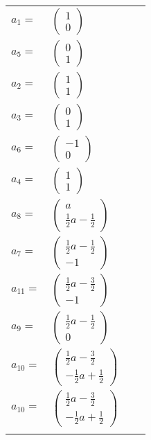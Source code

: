 \documentclass[1p]{elsarticle_modified}
\theoremstyle{definition}
\begin{document}
\begin{tabular}{m{7pt} m{180pt} m{7pt} m{180pt} }
\flushright $a_{1}=$&$\begin{pmatrix}1\\0\end{pmatrix}$ \\
\flushright $a_{5}=$&$\begin{pmatrix}0\\1\end{pmatrix}$ \\
\flushright $a_{2}=$&$\begin{pmatrix}1\\1\end{pmatrix}$ \\
\flushright $a_{3}=$&$\begin{pmatrix}0\\1\end{pmatrix}$ \\
\flushright $a_{6}=$&$\begin{pmatrix}-1\\0\end{pmatrix}$ \\
\flushright $a_{4}=$&$\begin{pmatrix}1\\1\end{pmatrix}$ \\
\flushright $a_{8}=$&$\begin{pmatrix}a\\\frac{1}{2} a-\frac{1}{2}\end{pmatrix}$ \\
\flushright $a_{7}=$&$\begin{pmatrix}\frac{1}{2} a-\frac{1}{2}\\-1\end{pmatrix}$ \\
\flushright $a_{11}=$&$\begin{pmatrix}\frac{1}{2} a-\frac{3}{2}\\-1\end{pmatrix}$ \\
\flushright $a_{9}=$&$\begin{pmatrix}\frac{1}{2} a-\frac{1}{2}\\0\end{pmatrix}$ \\
\flushright $a_{10}=$&$\begin{pmatrix}\frac{1}{2} a-\frac{3}{2}\\-\frac{1}{2} a+\frac{1}{2}\end{pmatrix}$\\ \flushright $a_{10}=$&$\begin{pmatrix}\frac{1}{2} a-\frac{3}{2}\\-\frac{1}{2} a+\frac{1}{2}\end{pmatrix}$\\&\end{tabular}
\end{document}
